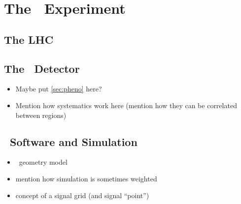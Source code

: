 \chapter{The \atlas\ Experiment}
\section{The LHC}
\section{The \atlas\ Detector}
\begin{itemize}
\item Maybe put \cref{sec:pheno} here?
\item Mention how systematics work here (mention how they can be correlated between regions)
\end{itemize}
\section{\atlas\ Software and Simulation}
\label{sec:software}
\begin{itemize}
\item \atlas\ geometry model
\item mention how simulation is sometimes weighted
\item concept of a signal grid (and signal ``point'')
\end{itemize}
